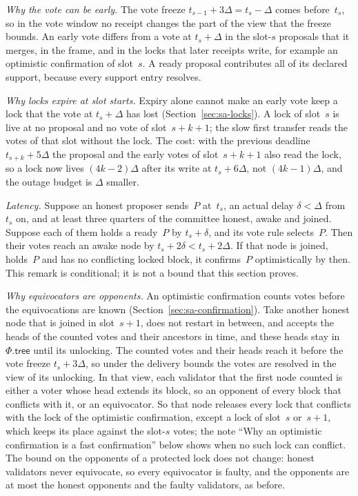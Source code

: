 \documentclass{article}
\newcommand{\Fr}{\Phi}
\newcommand{\tree}{\mathsf{tree}}
\begin{document}
\emph{Why the vote can be early.}  The vote freeze $t_{s-1}+3\Delta=t_s-\Delta$
comes before~$t_s$, so in the vote window no receipt changes the part of
the view that the freeze bounds.  An early vote differs from a vote at
$t_s+\Delta$ in the slot-$s$ proposals that it merges, in the frame, and
in the locks that later receipts write, for example an optimistic
confirmation of slot~$s$.  A ready proposal contributes all of its declared support, because
every support entry resolves.

\emph{Why locks expire at slot starts.}  Expiry alone cannot make an
early vote keep a lock that the vote at $t_s+\Delta$ has lost
(Section~\ref{sec:sa-locks}).  A lock of slot~$s$ is live at no proposal and no vote of
slot~$s+k+1$; the slow first transfer reads the votes of that slot
without the lock.  The cost: with the previous deadline $t_{s+k}+5\Delta$ the
proposal and the early votes of slot~$s+k+1$ also read the lock, so a lock
now lives $(4k-2)\Delta$ after its write at $t_s+6\Delta$, not
$(4k-1)\Delta$, and the outage budget is $\Delta$ smaller.

\emph{Latency.}  Suppose an honest proposer sends~$P$ at~$t_s$, an actual
delay $\delta<\Delta$ from~$t_s$ on, and at least three quarters of the
committee honest, awake and joined.  Suppose each of them holds a ready~$P$
by $t_s+\delta$, and its vote rule selects~$P$.  Then their votes reach an
awake node by $t_s+2\delta<t_s+2\Delta$.  If that node is joined, holds~$P$
and has no conflicting locked block, it confirms~$P$ optimistically by
then.  This remark is conditional; it is not a bound that this section
proves.

\emph{Why equivocators are opponents.}  An optimistic confirmation counts votes
before the equivocations are known (Section~\ref{sec:sa-confirmation}).
Take another honest node that is joined in slot~$s+1$, does not restart
in between, and accepts the heads of the counted votes and their
ancestors in time, and these heads stay in $\Fr.\tree$ until its
unlocking.  The counted votes and their heads reach it before the vote
freeze $t_s+3\Delta$, so under the delivery bounds the votes are resolved
in the view of its unlocking.  In
that view, each validator
that the first node counted is either a voter whose head extends its
block, so an opponent of every block that conflicts with it, or an
equivocator.  So that node releases every lock
that conflicts with the lock of the optimistic confirmation, except a lock
of slot~$s$ or~$s+1$, which keeps its place against the slot-$s$ votes;
the note ``Why an optimistic
confirmation is a fast confirmation'' below
shows when no such lock can conflict.  The bound on the opponents of a protected lock does not
change: honest validators never equivocate, so every equivocator is
faulty, and the opponents are at most the honest opponents and the faulty
validators, as before.
\end{document}
